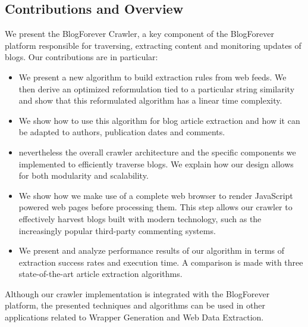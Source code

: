 \subsection{Contributions and Overview}
We present the BlogForever Crawler, a key component of the BlogForever platform responsible for traversing, extracting content and monitoring updates of blogs. Our contributions are in particular:

\begin{itemize}
  \item We present a new algorithm to build extraction rules from web feeds. We then derive an optimized reformulation tied to a particular string similarity and show that this reformulated algorithm has a linear time complexity.
  \item We show how to use this algorithm for blog article extraction and how it can be adapted to authors, publication dates and comments.
  \item nevertheless the overall crawler architecture and the specific components we implemented to efficiently traverse blogs. We explain how our design allows for both modularity and scalability.
  \item We show how we make use of a complete web browser to render JavaScript powered web pages before processing them. This step allows our crawler to effectively harvest blogs built with modern technology, such as the increasingly popular third-party commenting systems.
  \item We present and analyze performance results of our algorithm in terms of extraction success rates and execution time. A comparison is made with three state-of-the-art article extraction algorithms.
\end{itemize}

Although our crawler implementation is integrated with the BlogForever platform, the presented techniques and algorithms can be used in other applications related to Wrapper Generation and Web Data Extraction.
